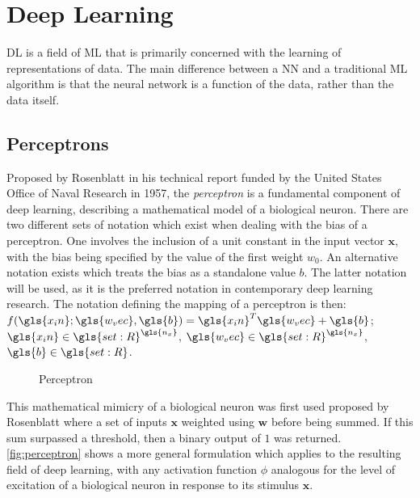 \section{Deep Learning\label{sec:DL}}

\Gls{DL} is a field of \gls{ML} that is primarily concerned with the learning of
representations of data. The main difference between a \gls{NN} and a
traditional \gls{ML} algorithm is that the neural network is a function of the
data, rather than the data itself.

\subsection{Perceptrons}

Proposed by Rosenblatt \cite{Rosenblatt_1957_6098} in his technical
report funded by the United States Office of Naval Research
\cite{doi:10.1177/030631296026003005} in 1957, the \textit{perceptron} is a
fundamental component of deep learning, describing a mathematical model of a
biological neuron. There are two different sets of notation which exist when
dealing with the bias of a perceptron. One involves the inclusion of a unit
constant in the input vector $\mathbf{x}$, with the bias being specified by the
value of the first weight $w_0$. An alternative notation exists which treats the
bias as a standalone value $b$. The latter notation will be used, as it is the
preferred notation in contemporary deep learning research. The notation defining
the mapping of a perceptron is then: $f(\gls{x_in};\gls{w_vec},
\gls{b})=\gls{x_in}^T\gls{w_vec}+\gls{b}$; $\gls{x_in}\in\gls{set:R}^{\gls{n_x}}$,
$\gls{w_vec}\in\gls{set:R}^{\gls{n_x}}$, $\gls{b}\in\gls{set:R}$.

\begin{figure}[htbp]
    \centering
    
    \caption{Perceptron}
    \label{fig:perceptron}
\end{figure}

This mathematical mimicry of a biological neuron was first used proposed by
Rosenblatt where a set of inputs $\mathbf{x}$ weighted using $\mathbf{w}$ before
being summed. If this sum surpassed a threshold, then a binary output of $1$ was
returned. \autoref{fig:perceptron} shows a more general formulation which
applies to the resulting field of deep learning, with any activation function
$\phi$ analogous for the level of excitation of a biological neuron in response
to its stimulus $\mathbf{x}$.


